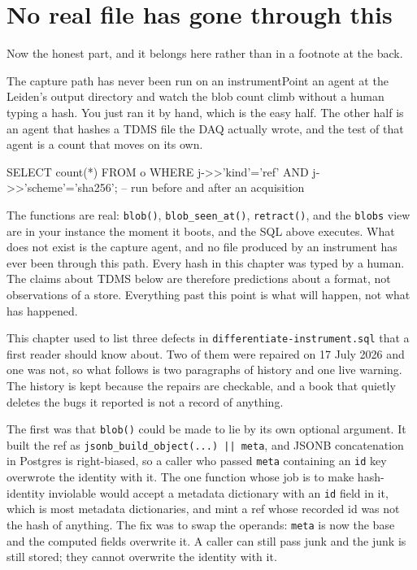 \section{No real file has gone through this}

Now the honest part, and it belongs here rather than in a footnote at the back.

\begin{Open}{The capture path has never been run on an instrument}{Point an agent at the Leiden's output directory and watch the blob count climb without a human typing a hash.}
You just ran it by hand, which is the easy half. The other half is an agent that hashes a TDMS file the DAQ actually wrote, and the test of that agent is a count that moves on its own.
\begin{Check}
SELECT count(*) FROM o
 WHERE j->>'kind'='ref' AND j->>'scheme'='sha256';   -- run before and after an acquisition
\end{Check}
The functions are real: \texttt{blob()}, \texttt{blob\_seen\_at()}, \texttt{retract()}, and the \texttt{blobs} view are in your instance the moment it boots, and the SQL above executes. What does not exist is the capture agent, and no file produced by an instrument has ever been through this path. Every hash in this chapter was typed by a human. The claims about TDMS below are therefore predictions about a format, not observations of a store. Everything past this point is what will happen, not what has happened.
\end{Open}

This chapter used to list three defects in \texttt{differentiate-instrument.sql} that a first reader should know about. Two of them were repaired on 17 July 2026 and one was not, so what follows is two paragraphs of history and one live warning. The history is kept because the repairs are checkable, and a book that quietly deletes the bugs it reported is not a record of anything.

The first was that \texttt{blob()} could be made to lie by its own optional argument. It built the ref as \texttt{jsonb\_build\_object(...) || meta}, and JSONB concatenation in Postgres is right-biased, so a caller who passed \texttt{meta} containing an \texttt{id} key overwrote the identity with it. The one function whose job is to make hash-identity inviolable would accept a metadata dictionary with an \texttt{id} field in it, which is most metadata dictionaries, and mint a ref whose recorded id was not the hash of anything. The fix was to swap the operands: \texttt{meta} is now the base and the computed fields overwrite it. A caller can still pass junk and the junk is still stored; they cannot overwrite the identity with it.

